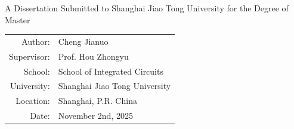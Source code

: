 \thispagestyle{empty}
\begin{center}
{ A Dissertation Submitted to Shanghai Jiao Tong University for the Degree of Master}\par
\vspace{2.5cm}
{\bfseries{}\MakeUppercase{\thesistitleen}}\par
\vspace{2.5cm}
\begin{tabular}{rl}
Author: & Cheng Jianuo\\[0.6em]
Supervisor: & Prof. Hou Zhongyu\\[0.6em]
School: & School of Integrated Circuits\\[0.6em]
University: & Shanghai Jiao Tong University\\[0.6em]
Location: & Shanghai, P.R. China\\[0.6em]
Date: & November 2nd, 2025\\
\end{tabular}
\end{center}
\clearpage
